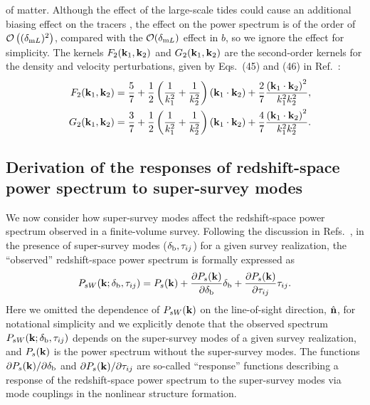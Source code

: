 \documentclass[prd,onecolumn,notitlepage,amsmath,amssymb,floatfix,superscriptaddress]{revtex4-1}
\newcommand{\bk}{{\bf k}}
\newcommand{\bn}{{\bf n}}
\newcommand{\br}{{\rm b}}
\newcommand{\dml}{\delta_{{\rm m}L}}
\begin{document}
of matter. Although the effect of the large-scale tides could cause an additional biasing effect on the tracers \cite{McDonaldRoy:09,Desjacquesetal:16,Chanetal:12,Saitoetal:14}, 
the effect on the power spectrum is of the order of $\mathcal{O}\left((\dml)^2\right)$, compared with the $\mathcal{O}(\dml)$ effect in $b$, so we ignore the effect for simplicity.  
The kernels $F_2(\bk_1,\bk_2)$ and $G_2(\bk_1,\bk_2)$ are the second-order 
kernels for the density and velocity perturbations, given by Eqs.~(45) and (46) in Ref.~\cite{Bernardeauetal:02}:
%
\begin{eqnarray}
&&F_2(\bk_1,\bk_2)=\frac{5}{7}+\frac{1}{2}\left(\frac{1}{k_1^2}+\frac{1}{k_2^2}\right)\left(\bk_1\cdot\bk_2\right)
+\frac{2}{7}\frac{\left(\bk_1\cdot\bk_2\right)^2}{k_1^2k_2^2},\nonumber\\
&&G_2(\bk_1,\bk_2)=\frac{3}{7}+\frac{1}{2}\left(\frac{1}{k_1^2}+\frac{1}{k_2^2}\right)\left(\bk_1\cdot\bk_2\right)
+\frac{4}{7}\frac{\left(\bk_1\cdot\bk_2\right)^2}{k_1^2k_2^2}.
\end{eqnarray}

\subsection{Derivation of the responses of redshift-space power spectrum to super-survey modes}

We now consider how super-survey modes affect the redshift-space power spectrum observed in a finite-volume 
survey. Following the discussion in Refs.~\cite{TakadaHu:13,Akitsuetal:17}, in the presence 
of super-survey modes ($\delta_\br,\tau_{ij}$) for a given survey realization, the ``observed'' redshift-space 
power spectrum is formally expressed as
%
\begin{eqnarray}
{P}_{sW}(\bk; \delta_\br, \tau_{ij}) = {P}_{s}(\bk) + 
\frac{\partial {P_s(\bk)}}{\partial \delta_\br} \delta_\br+ \frac{\partial {P_s(\bk)}}{\partial \tau_{ij}}\tau_{ij}   
\label{eq:P_sW}.
\end{eqnarray}
%
Here we omitted the dependence of $P_{sW}(\bk)$ on the line-of-sight direction, $\hat{\bn}$, for notational simplicity and 
we explicitly denote that the observed spectrum $P_{sW}(\bk; \delta_\br,\tau_{ij})$ depends 
on the super-survey modes of a given survey realization, 
and $P_s(\bk)$ is the power spectrum without the super-survey modes. The functions $\partial  P_s(\bk)/\partial \delta_\br$
and $\partial P_s(\bk)/\partial \tau_{ij}$ are so-called 
``response'' functions describing a response of the redshift-space power spectrum 
to the super-survey modes via mode couplings in the nonlinear structure formation. 
\end{document}

